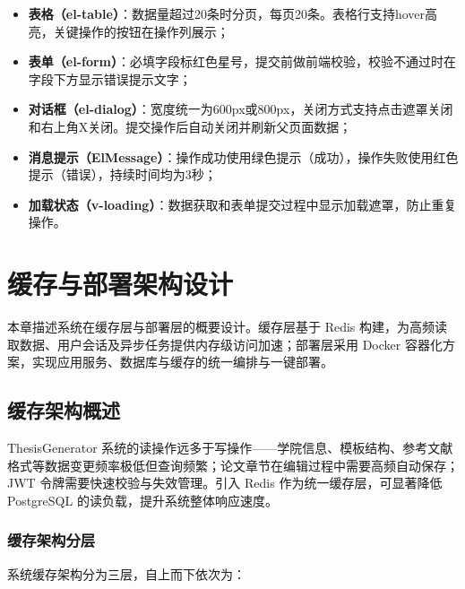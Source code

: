\documentclass{../../softeng}
\begin{document}
\begin{itemize}
    \item \textbf{表格（el-table）}：数据量超过20条时分页，每页20条。表格行支持hover高亮，关键操作的按钮在操作列展示；
    \item \textbf{表单（el-form）}：必填字段标红色星号，提交前做前端校验，校验不通过时在字段下方显示错误提示文字；
    \item \textbf{对话框（el-dialog）}：宽度统一为600px或800px，关闭方式支持点击遮罩关闭和右上角X关闭。提交操作后自动关闭并刷新父页面数据；
    \item \textbf{消息提示（ElMessage）}：操作成功使用绿色提示（成功），操作失败使用红色提示（错误），持续时间均为3秒；
    \item \textbf{加载状态（v-loading）}：数据获取和表单提交过程中显示加载遮罩，防止重复操作。
\end{itemize}

\section{缓存与部署架构设计}

本章描述系统在缓存层与部署层的概要设计。缓存层基于 Redis 构建，为高频读取数据、用户会话及异步任务提供内存级访问加速；部署层采用 Docker 容器化方案，实现应用服务、数据库与缓存的统一编排与一键部署。

\subsection{缓存架构概述}

ThesisGenerator 系统的读操作远多于写操作——学院信息、模板结构、参考文献格式等数据变更频率极低但查询频繁；论文章节在编辑过程中需要高频自动保存；JWT 令牌需要快速校验与失效管理。引入 Redis 作为统一缓存层，可显著降低 PostgreSQL 的读负载，提升系统整体响应速度。

\subsubsection{缓存架构分层}

系统缓存架构分为三层，自上而下依次为：
\end{document}
